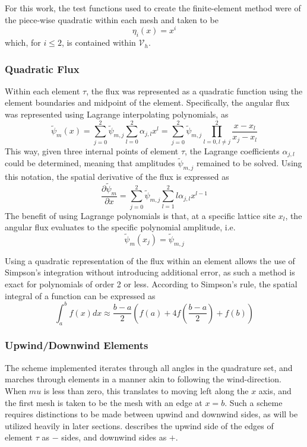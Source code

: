 \documentclass{article}
\newcommand{\mfesv}{\mathcal{V}_h}
\newcommand{\pdiff}[2]{\frac{\partial#1}{\partial#2}}
\newcommand{\tfem}{finite-element method }
\newcommand{\fepsi}{\tilde{\psi}}
\newcommand{\fepsim}{\fepsi_m}
\newcommand{\fepsimj}{\fepsi_{m,j}}
\newcommand{\ajl}{\alpha_{j,l}}
\begin{document}
For this work, the test functions used to create the \tfem were of the piece-wise quadratic within each
mesh and taken to be
\begin{equation}
    \label{eq:testfuncs}
    \eta_i(x) = x^i
\end{equation}
which, for $i\leq2$, is contained within $\mfesv$.

\subsubsection{Quadratic Flux}
Within each element $\tau$, the flux was represented as a quadratic function using the element boundaries and 
midpoint of the element.
Specifically, the angular flux was represented using Lagrange interpolating polynomials, as
\begin{equation}
    \label{eq:fluxPoly}
    \fepsim(x) = \sum_{j=0}^2\fepsimj\sum_{l=0}^2\ajl x^l
    = \sum_{j=0}^2\fepsimj\prod_{l=0,l\neq j}^2\frac{x-x_l}{x_j-x_l}
\end{equation}
This way, given three internal points of element $\tau$, the Lagrange coefficients
$\ajl$ could be determined, meaning that amplitudes $\fepsimj$ remained to
be solved.
Using this notation, the spatial derivative of the flux is expressed as
\begin{equation}
    \label{eq:fluxDeriv}
    \pdiff{\fepsim}{x} = \sum_{j=0}^2\fepsimj\sum_{l=1}^2l\ajl x^{l-1}
\end{equation}
The benefit of using Lagrange polynomials is that, at a specific lattice site $x_l$, the 
angular flux evaluates to the specific polynomial amplitude, i.e.
\begin{equation}
    \tilde{\psi}_m(x_j) =\fepsimj 
\end{equation}

Using a quadratic representation of the flux within an element allows the use of Simpson's
integration without introducing additional error, as such a method is exact for polynomials
of order 2 or less.
According to Simpson's rule, the spatial integral of a function can be expressed as
\begin{equation}
    \label{eq:simpsInt}
    \int_a^bf(x)dx \approx \frac{b-a}{2}\left(f(a) + 4f\left(\frac{b-a}{2}\right) + f(b)\right)
\end{equation}

\subsubsection{Upwind/Downwind Elements}
The scheme implemented iterates through all angles in the quadrature set, and marches through
elements in a manner akin to following the wind-direction. When $mu$ is less than zero, this 
translates to moving left along the $x$ axis, and the first mesh is taken to be the mesh
with an edge at $x=b$. 
Such a scheme requires distinctions to be made between upwind and downwind sides, as will be utilized
heavily in later sections.  describes the upwind side of the edges of element $\tau$
as $-$ sides, and downwind sides as $+$.
\end{document}
